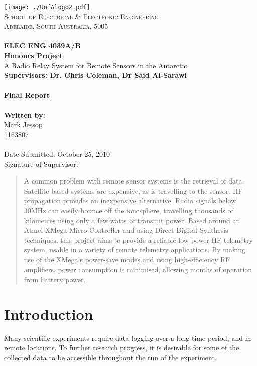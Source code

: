 \documentclass[a4paper,12pt]{article}
\begin{document}
\thispagestyle{empty}
\vspace*{\fill}
\texttt{[image: ./UofAlogo2.pdf]}\\
\noindent
\textsc{
\textsc{School of Electrical \& Electronic Engineering}\\
Adelaide, South Australia, 5005\\ \\
}
\noindent
\Large{\textbf{
ELEC ENG 4039A/B \\
Honours Project\\
	}}
	\Large{
		A Radio Relay System for Remote Sensors in the Antarctic \\
	}
	\small{\textbf{Supervisors: Dr. Chris Coleman, Dr Said Al-Sarawi}}
	\ \\
	\ \\
	\Large{\textbf{
		Final Report \\
	}}
	\ \\
	\small{\textbf{
		Written by: \\}
		Mark Jessop \\
		1163807
	}
	\ \\
	\ \\
	Date Submitted: October 25, 2010 \\
	Signature of Supervisor: \\
 \vspace*{\fill}

\newpage
 \thispagestyle{empty}
 \vspace*{\fill}
\begin{abstract}
\noindent
A common problem with remote sensor systems is the retrieval of data. Satellite-based systems are expensive, as is travelling to the sensor. HF propagation provides an inexpensive alternative. Radio signals below 30MHz can easily bounce off the ionosphere, travelling thousands of kilometres using only a few watts of transmit power.
Based around an Atmel XMega Micro-Controller and using Direct Digital Synthesis techniques, this project aims to provide a reliable low power HF telemetry system, usable in a variety of remote telemetry applications. 
By making use of the XMega's power-save modes and using high-efficiency RF amplifiers, power consumption is minimised, allowing months of operation from battery power.
\end{abstract}
\vspace*{\fill}
\newpage
\setcounter{tocdepth}{2}
\tableofcontents
\newpage

\section{Introduction}
Many scientific experiments require data logging over a long time period, and in remote locations. To further research progress, it is desirable for some of the collected data to be accessible throughout the run of the experiment.
\end{document}
